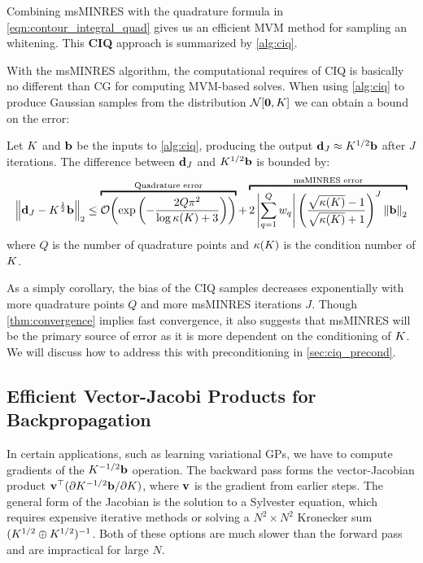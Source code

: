 Combining msMINRES with the quadrature formula in \cref{eqn:contour_integral_quad} gives us an efficient MVM method for sampling an whitening.
This {\bf CIQ} approach is summarized by \cref{alg:ciq}.

With the msMINRES algorithm, the computational requires of CIQ is basically no different than CG for computing MVM-based solves.
When using \cref{alg:ciq} to produce Gaussian samples from the distribution $\normaldist{\bzero}{\bK}$ we can obtain a bound on the error:
%
\begin{theorem}
  Let $K$ and $\mathbf{b}$ be the inputs to \cref{alg:ciq}, producing the output $\mathbf{d}_J \approx K^{1/2} \mathbf{b}$ after $J$ iterations.
  The difference between $\mathbf{d}_J$ and $K^{1/2} \mathbf{b}$ is bounded by:
  \begin{equation}
    \left\Vert \bd_J - \bK^{\frac 1 2} \bb \right\Vert_2
    \leq
    \overbracket{
      \bigo{\exp\left( -\frac{2 Q \pi^2}{\log \kappa(\bK) + 3} \right)}
    }^{\text{Quadrature error}}
    +
    \overbracket{
      2 \left\vert \sum_{q=1}^Q w_q \right\vert
      \left( \frac{ \sqrt{\kappa(\bK)} - 1}{ \sqrt{\kappa(\bK)} + 1} \right)^J
      \left\Vert \bb \right\Vert_2
    }^{\text{msMINRES error}}
  \end{equation}
  where $Q$ is the number of quadrature points and $\kappa(K)$ is the condition number of $K$.
  \label{thm:convergence}
\end{theorem}
%
As a simply corollary, the bias of the CIQ samples decreases exponentially with more quadrature points $Q$ and more msMINRES iterations $J$.
Though \cref{thm:convergence} implies fast convergence, it also suggests that msMINRES will be the primary source of error as it is more dependent on the conditioning of $K$.
We will discuss how to address this with preconditioning in \cref{sec:ciq_precond}.




\subsection{Efficient Vector-Jacobi Products for Backpropagation}

In certain applications, such as learning variational GPs, we have to compute gradients of the $K^{-1/2} \mathbf{b}$ operation.
The backward pass forms the vector-Jacobian product $\mathbf{v}^\top ( \partial K^{-1/2} \mathbf{b} / \partial K)$, where $\mathbf{v}$ is the gradient from earlier steps.
The general form of the Jacobian is the solution to a Sylvester equation, which requires expensive iterative methods or solving a $N^2 \times N^2$ Kronecker sum $(K^{1/2} \oplus K^{1/2})^{-1}$.
Both of these options are much slower than the forward pass and are impractical for large $N$.

